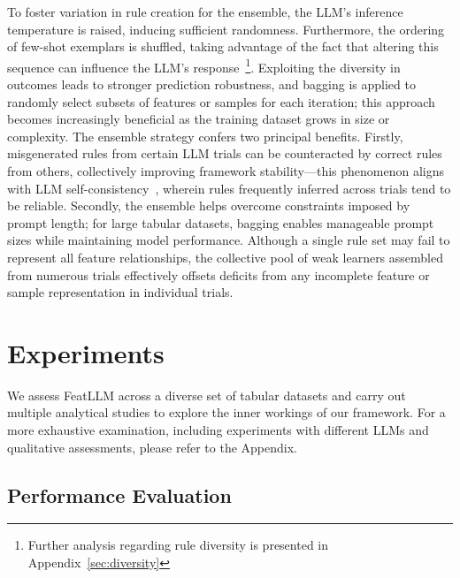 To foster variation in rule creation for the ensemble, the LLM’s inference temperature is raised, inducing sufficient randomness. Furthermore, the ordering of few-shot exemplars is shuffled, taking advantage of the fact that altering this sequence can influence the LLM’s response~\cite{lu2022fantastically}\footnote{Further analysis regarding rule diversity is presented in Appendix~\ref{sec:diversity}}. Exploiting the diversity in outcomes leads to stronger prediction robustness, and bagging is applied to randomly select subsets of features or samples for each iteration; this approach becomes increasingly beneficial as the training dataset grows in size or complexity. The ensemble strategy confers two principal benefits. Firstly, misgenerated rules from certain LLM trials can be counteracted by correct rules from others, collectively improving framework stability—this phenomenon aligns with LLM self-consistency~\cite{wang2022self}, wherein rules frequently inferred across trials tend to be reliable. Secondly, the ensemble helps overcome constraints imposed by prompt length; for large tabular datasets, bagging enables manageable prompt sizes while maintaining model performance. Although a single rule set may fail to represent all feature relationships, the collective pool of weak learners assembled from numerous trials effectively offsets deficits from any incomplete feature or sample representation in individual trials.

\section{Experiments}
We assess \textsf{FeatLLM} across a diverse set of tabular datasets and carry out multiple analytical studies to explore the inner workings of our framework. For a more exhaustive examination, including experiments with different LLMs and qualitative assessments, please refer to the Appendix.

\subsection{Performance Evaluation}
